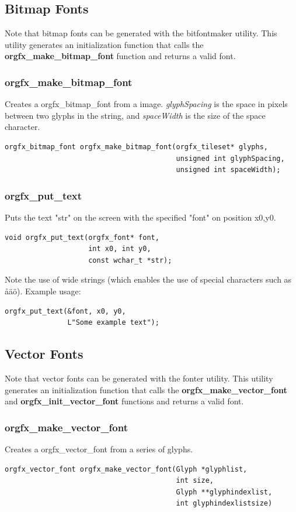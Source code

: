 \documentclass[10pt,a4paper]{article}
\begin{document}
\subsection{Bitmap Fonts}
Note that bitmap fonts can be generated with the bitfontmaker utility. This utility generates an initialization function that calls the \textbf{orgfx\_make\_bitmap\_font} function and returns a valid font.

\subsubsection{orgfx\_make\_bitmap\_font}
Creates a orgfx\_bitmap\_font from a image. \textit{glyphSpacing} is the space in pixels between two glyphs in the string, and \textit{spaceWidth} is the size of the space character.
\begin{lstlisting}
orgfx_bitmap_font orgfx_make_bitmap_font(orgfx_tileset* glyphs,
                                         unsigned int glyphSpacing,
                                         unsigned int spaceWidth);
\end{lstlisting}

\subsubsection{orgfx\_put\_text}
Puts the text "str" on the screen with the specified "font" on position x0,y0. 
\begin{lstlisting}
void orgfx_put_text(orgfx_font* font,
                    int x0, int y0,
                    const wchar_t *str);
\end{lstlisting}

Note the use of wide strings (which enables the use of special characters such as \aa \"{a}\"{o}). Example usage:

\begin{lstlisting}
orgfx_put_text(&font, x0, y0,
               L"Some example text");
\end{lstlisting}

\subsection{Vector Fonts}
Note that vector fonts can be generated with the fonter utility. This utility generates an initialization function that calls the \textbf{orgfx\_make\_vector\_font} and \textbf{orgfx\_init\_vector\_font} functions and returns a valid font.

\subsubsection{orgfx\_make\_vector\_font}
Creates a orgfx\_vector\_font from a series of glyphs.
\begin{lstlisting}
orgfx_vector_font orgfx_make_vector_font(Glyph *glyphlist,
                                         int size,
                                         Glyph **glyphindexlist,
                                         int glyphindexlistsize)
\end{lstlisting}
\end{document}

